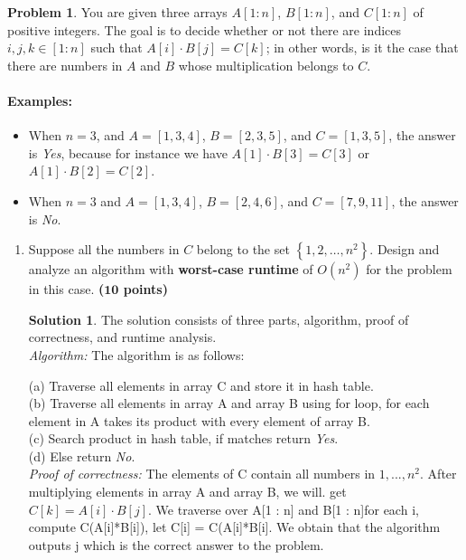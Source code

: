 \documentclass{article}
\theoremstyle{definition}
\newtheorem{problem}{Problem}
\newtheorem*{solution*}{Solution}
\newenvironment{solution}{\begin{solution*}}{{} \end{solution*}}
\newcommand{\grade}[1]{\hfill{\textbf{($\mathbf{#1}$ points)}}}
\newcommand{\set}[1]{\ensuremath{\left\{ #1 \right\}}}
\begin{document}
\begin{problem}\label{hash}
	You are given three arrays $A[1:n]$, $B[1:n]$, and $C[1:n]$ of positive integers. The goal is to decide whether or not there are indices $i,j,k \in [1:n]$ such that $A[i] \cdot B[j] = C[k]$; in other words, is it the case that there are numbers in $A$ and $B$ whose multiplication belongs to $C$. 
	
	
	\paragraph{Examples:} 
	\begin{itemize}
		\item When $n=3$, and $A = [1,3,4]$, $B=[2,3,5]$, and $C=[1,3,5]$, the answer is \emph{Yes}, because for instance we have $A[1] \cdot B[3] = C[3]$ or $A[1] \cdot B[2] = C[2]$. 
		\item When $n=3$ and $A = [1,3,4]$, $B=[2,4,6]$, and $C=[7,9,11]$, the answer is \emph{No}. 
	\end{itemize} 
	
	\begin{enumerate}[label=$(\alph*)$]
	\item Suppose all the numbers in $C$ belong to the set $\set{1,2,\ldots, n^2}$. Design and analyze an algorithm with \textbf{worst-case runtime} of $O(n^2)$ for the problem in this case. \grade{10} 
	\bigskip	
	\begin{solution} The solution consists of three parts, algorithm, proof of correctness, and runtime analysis. \\
	
	\emph{Algorithm:} The algorithm is as follows: 
	
	(a) Traverse all elements in array C and store it in hash table. \\
	(b) Traverse all elements in array A and array B using for loop, for each element in A takes its product with every element of array B. \\
	(c) Search product in hash table, if matches return \emph{Yes}. \\
	(d) Else return \emph{No}. \\
	
	\emph{Proof of correctness:} The elements of C contain all numbers in ${1, . . . , n^2}$. After multiplying elements in array A and array B, we will. get $C[k] = A[i] \cdot B[j]$. We traverse over A[1 : n] and B[1 : n]for each i, compute 	C(A[i]*B[i]), let C[i] = C(A[i]*B[i]. We obtain that the algorithm outputs j which is the correct answer to the problem.
	

\end{solution}
\end{enumerate}
\end{problem}
\end{document}
